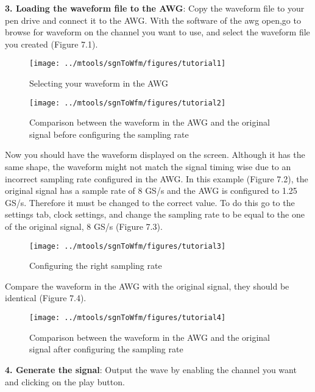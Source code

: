 \noindent
\textbf{3. Loading the waveform file to the AWG}:
Copy the waveform file to your pen drive and connect it to the AWG. With the software of the awg open,go to browse for waveform on the channel you want to use, and select the waveform file you created (Figure 7.1).

\begin{figure}[h]
	\centering
	\texttt{[image: ../mtools/sgnToWfm/figures/tutorial1]}
	\label{TUT_SelectingWFM}\caption{Selecting your waveform in the AWG}
\end{figure}
\begin{figure}[h]
	\centering
	\texttt{[image: ../mtools/sgnToWfm/figures/tutorial2]}
	\label{TUT_CompBad}\caption{Comparison between the waveform in the AWG and the original signal before configuring the sampling rate}
\end{figure}

Now you should have the waveform displayed on the screen. Although it has the same shape,  the waveform might not match the signal timing wise due to an incorrect sampling rate  configured in the AWG.
In this example (Figure 7.2), the original signal has a sample rate of 8 GS/s and the AWG is configured to 1.25 GS/s. Therefore it must be changed to the correct value.
To do this go to the settings tab, clock settings, and change the sampling rate to be equal to the one of the original signal, 8 GS/s (Figure 7.3).
\begin{figure}[h]
	\centering
	\texttt{[image: ../mtools/sgnToWfm/figures/tutorial3]}
	\label{TUT_ConfigSR}\caption{Configuring the right sampling rate}
\end{figure}
Compare the waveform in the AWG with the original signal, they should be identical (Figure 7.4).
\begin{figure}[h]
	\centering
	\texttt{[image: ../mtools/sgnToWfm/figures/tutorial4]}
	\label{TUT_CompGood}\caption{Comparison between the waveform in the AWG and the original signal after configuring the sampling rate}
\end{figure}
\bigskip

\noindent
\textbf{4. Generate the signal}:
Output the wave by enabling the channel you want and clicking on the play button.


% 